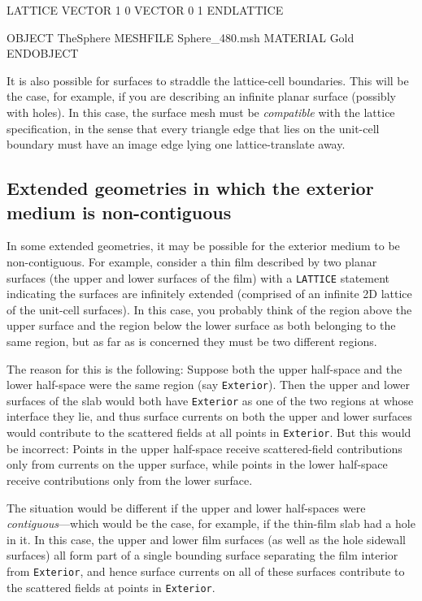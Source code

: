 \medskip

\begin{verbcode}
LATTICE
        VECTOR 1 0 
        VECTOR 0 1 
ENDLATTICE

OBJECT TheSphere
        MESHFILE Sphere_480.msh
        MATERIAL Gold
ENDOBJECT
\end{verbcode}

\medskip

It is also possible for surfaces to straddle 
the lattice-cell boundaries. This will be the 
case, for example, if you are describing an
infinite planar surface (possibly with
holes). In this case, the surface mesh must
be \textit{compatible} with the lattice specification,
in the sense that every triangle edge that 
lies on the unit-cell boundary must have an
image edge lying one lattice-translate away.

\subsection*{Extended geometries in which the exterior medium
             is non-contiguous}

In some extended geometries, it may be possible for the 
exterior medium to be non-contiguous. For example,
consider a thin film described by two planar surfaces  
(the upper and lower surfaces of the film) with a
\texttt{LATTICE} statement indicating the surfaces
are infinitely extended (comprised of an infinite
2D lattice of the unit-cell surfaces).
In this case, you probably think of the region above the 
upper surface and the region below the lower surface as 
both belonging to the same region, but as far as 
\lss is concerned they must be two different regions.

The reason for this is the following: Suppose both
the upper half-space and the lower half-space were
the same region (say \texttt{Exterior}). Then the upper 
and lower surfaces of the slab would both have 
\texttt{Exterior} as one of the two regions 
at whose interface they lie, and thus surface currents
on both the upper and lower surfaces would contribute 
to the scattered fields at all points in \texttt{Exterior}.
But this would be incorrect: Points in the upper half-space
receive scattered-field contributions only from currents
on the upper surface, while points in the lower half-space 
receive contributions only from the lower surface. 

The situation would be different if the upper and lower 
half-spaces were \textit{contiguous}---which would be
the case, for example, if the thin-film slab had a hole
in it. In this case, the upper and lower film surfaces
(as well as the hole sidewall surfaces) all form 
part of a single bounding surface separating the 
film interior from \texttt{Exterior}, and hence surface
currents on all of these surfaces contribute to the
scattered fields at points in \texttt{Exterior}.

